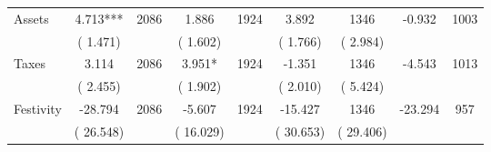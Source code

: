 \begin{tabular}{l*{8}{c}}
Assets        &              4.713***      &       2086       &              1.886      &       1924       &              3.892      &       1346  &       -0.932 &       1003       \\
                       &       (       1.471)            &                               &       (       1.602)            &                               &       (       1.766)            &       (       2.984) &                  \\
Taxes        &              3.114      &       2086       &              3.951*      &       1924       &             -1.351      &       1346  &       -4.543 &       1013       \\
                       &       (       2.455)            &                               &       (       1.902)            &                               &       (       2.010)            &       (       5.424) &                  \\
Festivity        &            -28.794      &       2086       &             -5.607      &       1924       &            -15.427      &       1346  &      -23.294 &       957       \\
                       &       (      26.548)            &                               &       (      16.029)            &                               &       (      30.653)            &       (      29.406) &                  \\
\hline \end{tabular}